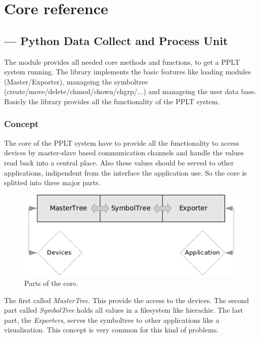 \chapter{Core reference}
\section{ --- 
        \textbf{Py}thon \textbf{D}ata \textbf{C}ollect and \textbf{P}rocess \textbf{U}nit}





The  module provides all needed core methods and functions, to
get a PPLT system running. The library implements the basic features like 
loading modules (Master/Exporter), manageing the symboltree 
(create/move/delete/chmod/chown/chgrp/...) and manageing the user
data base. Basicly the  library provides all the functionality
of the PPLT system. 

\subsection{Concept} 
The core of the PPLT system have to provide all the functionality to access devices
by master-slave based communication channels and handle the values read back into
a central place. Also these values should be served to other applications, indipendent
from the interface the application use. So the core is splitted into three major parts.

\begin{figure}[ht]
    \centering
    \label{cDCPU}
    \includegraphics[scale=1]{cDCPU.png}
    \caption{Parts of the core.}
\end{figure}

The first called \textit{MasterTree}. This provide the access to the devices. The 
second part called \textit{SymbolTree} holds all values in a filesystem like 
hierachie. The last part, the \textit{Exporters}, serves the symboltree to other
applications like a visualisation. This concept is very common for this kind of 
problems. 

